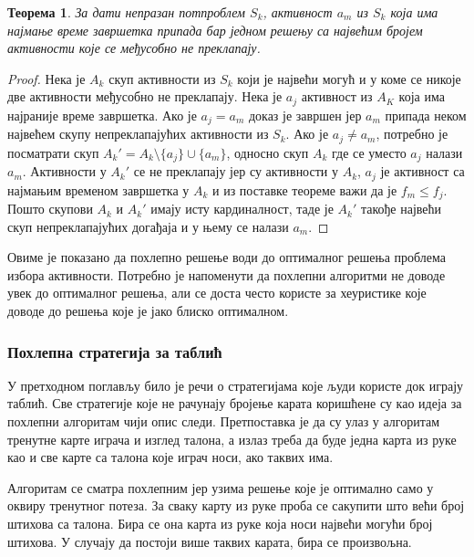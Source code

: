 \documentclass[a4paper, 12pt, ngerman]{article}
\newtheorem{theorem}{Теорема}
\begin{document}
\begin{theorem}
За дати непразан потпроблем $S_k$, активност $a_m$ из $S_k$ која има најмање време завршетка припада бар једном решењу са највећим бројем активности које се међусобно не преклапају.
\end{theorem}

\begin{proof}
Нека је $A_k$ скуп активности из $S_k$ који је највећи могућ и у коме се никоје две активности међусобно не преклапају. Нека је $a_j$ активност из $A_K$ која има најраније време завршетка. Ако је $a_j = a_m$ доказ је завршен јер $a_m$ припада неком највећем скупу непреклапајућих активности из $S_k$. Ако је $a_j \ne a_m$, потребно је посматрати скуп $A_k' = A_k \setminus \{a_j\} \cup \{a_m\}$, односно скуп $A_k$ где се уместо $a_j$ налази $a_m$. Активности у $A_k'$ се не преклапају јер су активности у $A_k$, $a_j$ је активност са најмањим временом завршетка у $A_k$ и из поставке теореме важи да је $f_m \le f_j$. Пошто скупови $A_k$ и $A_k'$ имају исту кардиналност, таде је $A_k'$ такође највећи скуп непреклапајућих догађаја и у њему се налази $a_m$.
\end{proof}

Овиме је показано да похлепно решење води до оптималног решења проблема избора активности. Потребно је напоменути да похлепни алгоритми не доводе увек до оптималног решења, али се доста често користе за хеуристике које доводе до решења које је јако блиско оптималном.

\subsubsection{Похлепна стратегија за таблић}
У претходном поглављу било је речи о стратегијама које људи користе док играју таблић. Све стратегије које не рачунају бројење карата коришћене су као идеја за похлепни алгоритам чији опис следи. Претпоставка је да су улаз у алгоритам тренутне карте играча и изглед талона, а излаз треба да буде једна карта из руке као и све карте са талона које играч носи, ако таквих има.

Алгоритам се сматра похлепним јер узима решење које је оптимално само у оквиру тренутног потеза. За сваку карту из руке проба се сакупити што већи број штихова са талона. Бира се она карта из руке која носи највећи могући број штихова. У случају да постоји више таквих карата, бира се произвољна.
\end{document}

